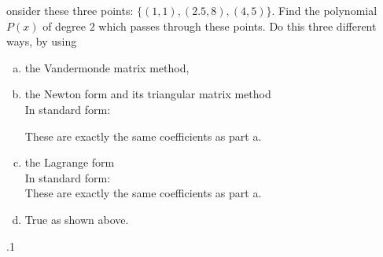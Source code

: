 \documentclass[12pt]{article}
\makeatletter
\theoremstyle{homework}
\newenvironment{exercise}[1]
{\def\@currentlabel{#1}\exercisecore}
{\endexercisecore}
\makeatother
\begin{document}
\begin{exercise}

Consider these three points: $\{(1,1), (2.5, 8), (4, 5)\}$. Find the polynomial $P(x)$ of degree
$2$ which passes through these points. Do this three different ways, by using
\end{exercise}
\begin{enumerate}[(a)]
\item
the Vandermonde matrix method,\\

\item
the Newton form and its triangular matrix method\\

In standard form:

These are exactly the same coefficients as part a.
\item
the Lagrange form\\

In standard form:\\

These are exactly the same coefficients as part a.
\item
True as shown above.
\end{enumerate}
\begin{exercise}

8.1
\end{exercise}
\end{document}
